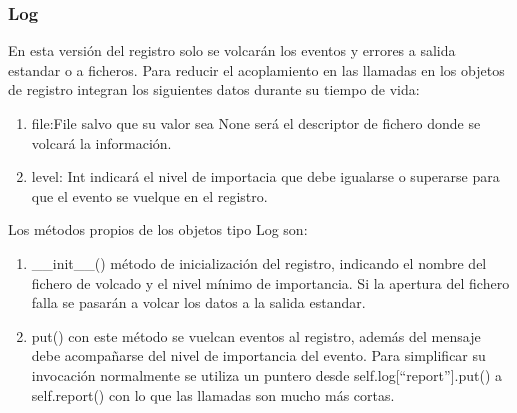 \documentclass[a4paper,spanish,12pt]{book}
\begin{document}
\subsubsection{Log}
En esta versión del registro solo se volcarán los eventos y errores a salida estandar o a ficheros. Para reducir el acoplamiento en las llamadas en los objetos de registro integran los siguientes datos durante su tiempo de vida:
\begin{enumerate}
	\item file:File salvo que su valor sea None será el descriptor de fichero donde se volcará la información.
	\item level: Int indicará el nivel de importacia que debe igualarse o superarse para que el evento se vuelque en el registro.
\end{enumerate}
Los m\'etodos propios de los objetos tipo Log son:
\begin{enumerate}
	\item \_\_init\_\_() m\'etodo de inicialización del registro, indicando el nombre del fichero de volcado y el nivel mínimo de importancia. Si la apertura del fichero falla se pasarán a volcar los datos a la salida estandar.
	\item put() con este m\'etodo se vuelcan eventos al registro, además del mensaje debe acompañarse del nivel de importancia del evento. Para simplificar su invocación normalmente se utiliza un puntero desde self.log[``report''].put() a self.report() con lo que las llamadas son mucho más cortas.
\end{enumerate}
\end{document}
